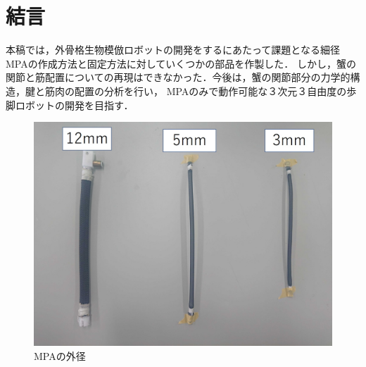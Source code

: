 \documentclass{jarticle}
\begin{document}
\vspace*{-2mm}
\section{結言}

本稿では，外骨格生物模倣ロボットの開発をするにあたって課題となる細径MPAの作成方法と固定方法に対していくつかの部品を作製した．
しかし，蟹の関節と筋配置についての再現はできなかった．今後は，蟹の関節部分の力学的構造，腱と筋肉の配置の分析を行い，
MPAのみで動作可能な３次元３自由度の歩脚ロボットの開発を目指す．



\begin{figure}[t]
  \begin{minipage}[b]{0.47\columnwidth}
    \centering
    \includegraphics[scale=0.15]{mpa.JPG}
    \vspace{-6.5mm}
    \caption{MPAの外径}
    \label{fig:MPA}
  \end{minipage}
  \hspace{0.04\columnwidth}
  \begin{minipage}[b]{0.47\columnwidth}
    \centering

\end{minipage}
\end{figure}
\end{document}
